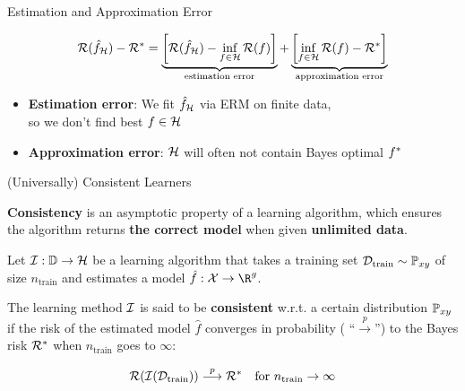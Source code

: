 \documentclass[11pt,compress,t,notes=noshow, xcolor=table]{beamer}
\begin{document}
\begin{frame}{Estimation and Approximation Error} 







$$
	\mathcal{R}(\hat f_{\mathcal{H}}) - \mathcal{R}^\ast = \underbrace{\left[\mathcal{R}(\hat f_{\mathcal{H}}) - \inf_{f \in \mathcal{H}} \mathcal{R}(f)\right]}_{\text{estimation error}} + \underbrace{\left[\inf_{f \in \mathcal{H}} \mathcal{R}(f) - \mathcal{R}^\ast\right]}_{\text{approximation error}}  
$$

\vfill

\begin{itemize}
\item \textbf{Estimation error}:
We fit $\hat f_{\mathcal{H}}$ via ERM on finite data, \\
so we don't find best $f \in \mathcal{H}$
\item \textbf{Approximation error}: 
$\mathcal{H}$ will often not contain Bayes optimal $f^{\ast}$ 
\end{itemize}

\end{frame}


\begin{frame}{(Universally) Consistent Learners }

\textbf{Consistency} is an asymptotic property of a learning algorithm, which ensures the algorithm returns \textbf{the correct model} when given \textbf{unlimited data}.

\vfill 

Let $\mathcal{I}:\mathbb{D} \to \mathcal{H}$ be a learning algorithm that takes a training set $\mathcal{D}_{\text{train}} \sim \mathbb{P}_{xy}$ of size $n_\text{train}$ and estimates a model $\hat f: \Xspace \to \R^g$. 

\vfill 

The learning method $\mathcal{I}$ is said to be \textbf{consistent} w.r.t. a certain distribution $\mathbb{P}_{xy}$ if the risk of the estimated model $\hat f$ converges in probability ( \enquote{$\overset{p}{\longrightarrow}$}) to the Bayes risk $\mathcal{R}^\ast$ when $n_\text{train}$ goes to $\infty$: 

$$
	\mathcal{R}(\mathcal{I}(\mathcal{D}_{\text{train}})) \overset{p}{\longrightarrow} \mathcal{R}^\ast \quad \text{for } n_\text{train} \to \infty
$$

\end{frame}
\end{document}
